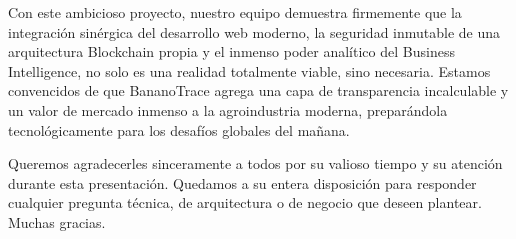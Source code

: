 \documentclass[12pt,a4paper]{article}
\begin{document}
Con este ambicioso proyecto, nuestro equipo demuestra firmemente que la integración sinérgica del desarrollo web moderno, la seguridad inmutable de una arquitectura Blockchain propia y el inmenso poder analítico del Business Intelligence, no solo es una realidad totalmente viable, sino necesaria. Estamos convencidos de que BananoTrace agrega una capa de transparencia incalculable y un valor de mercado inmenso a la agroindustria moderna, preparándola tecnológicamente para los desafíos globales del mañana. 

Queremos agradecerles sinceramente a todos por su valioso tiempo y su atención durante esta presentación. Quedamos a su entera disposición para responder cualquier pregunta técnica, de arquitectura o de negocio que deseen plantear. Muchas gracias.
\end{document}
